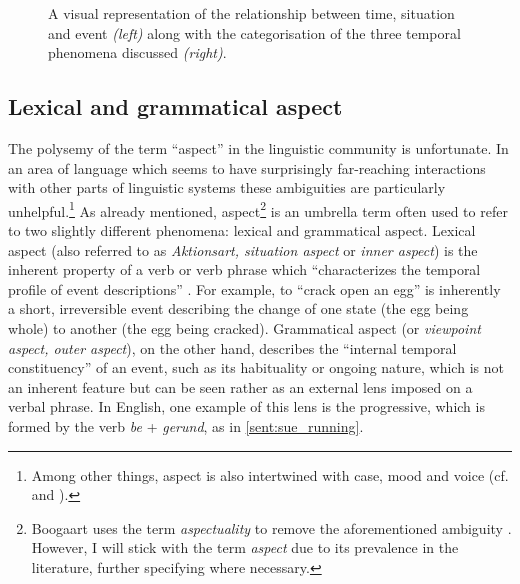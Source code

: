 \begin{figure}
    \hspace{2cm}
    \caption{A visual representation of the relationship between time, situation and event \emph{(left)} along with the categorisation of the three temporal phenomena discussed \emph{(right)}.}
    \label{fig:TimeSitEvent}
\end{figure}

\subsection{Lexical and grammatical aspect}
The polysemy of the term “aspect” in the linguistic community is unfortunate. In an area of language which seems to have surprisingly far-reaching interactions with other parts of linguistic systems these ambiguities are particularly unhelpful.\footnote{Among other things, aspect is also intertwined with case, mood and voice (cf. \citet{franks2005slavic} and \citet{Kiparsky2004PartitiveCA}).}
As already mentioned, aspect\footnote{Boogaart uses the term \emph{aspectuality} to remove the aforementioned ambiguity \citep{Boogaart+2004+1165+1180}. However, I will stick with the term \emph{aspect} due to its prevalence in the literature, further specifying where necessary.} is an umbrella term often used to refer to two slightly different phenomena: lexical and grammatical aspect. Lexical aspect (also referred to as \emph{Aktionsart, situation aspect} or \emph{inner aspect}) is the inherent property of a verb or verb phrase which “characterizes the temporal profile of event descriptions” \citep{10.1093/oxfordhb/9780199601264.013.25}. For example, to “crack open an egg” is inherently a short, irreversible event describing the change of one state (the egg being whole) to another (the egg being cracked). Grammatical aspect (or \emph{viewpoint aspect, outer aspect}), on the other hand, describes the “internal temporal constituency” \citep{comrie1976aspect} of an event, such as its habituality or ongoing nature, which is not an inherent feature but can be seen rather as an external lens imposed on a verbal phrase. In English, one example of this lens is the progressive, which is formed by the verb \emph{be} + \emph{gerund}, as in \ref{sent:sue_running}.

